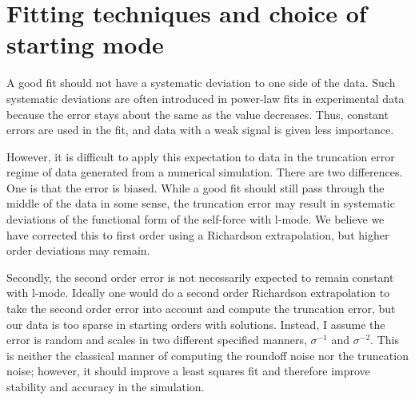 \section{Fitting techniques and choice of starting mode}
\label{fitting}
A good fit should not have a systematic deviation to one side of the data. Such systematic deviations are often introduced in power-law fits in experimental data because the error stays about the same as the value decreases. Thus, constant errors are used in the fit, and data with a weak signal is given less importance.

However, it is difficult to apply this expectation to data in the truncation error regime of data generated from a numerical simulation. There are two differences. One is that the error is biased. While a good fit should still pass through the middle of the data in some sense, the truncation error may result in systematic deviations of the functional form of the self-force with l-mode. We believe we have corrected this to first order using a Richardson extrapolation, but higher order deviations may remain.

Secondly, the second order error is not necessarily expected to remain constant with l-mode. Ideally one would do a second order Richardson extrapolation to take the second order error into account and compute the truncation error, but our data is too sparse in starting orders with solutions. Instead, I assume the error is random and scales in two different specified manners, $\sigma^{-1}$ and $\sigma^{-2}$. This is neither the classical manner of computing the roundoff noise nor the truncation noise; however, it should improve a least squares fit and therefore improve stability and accuracy in the simulation.  

